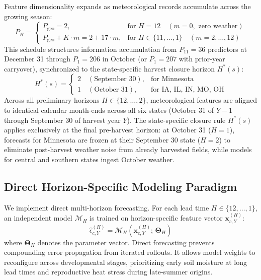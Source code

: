 Feature dimensionality expands as meteorological records accumulate across the growing season:
\begin{equation}
    P_H = 
    \begin{cases}
        P_{\text{geo}} = 2, & \text{for } H = 12 \quad (m = 0, \text{ zero weather}) \\[1ex]
        P_{\text{geo}} + K \cdot m = 2 + 17 \cdot m, & \text{for } H \in \{11, \dots, 1\} \quad (m = 2, \dots, 12)
    \end{cases}
    \label{eq:feature_dimension_formula}
\end{equation}
This schedule structures information accumulation from $P_{11} = 36$ predictors at December 31 through $P_1 = 206$ in October (or $P_1 = 207$ with prior-year carryover), synchronized to the state-specific harvest closure horizon $H^*(s)$:
\begin{equation}
    H^*(s) = 
    \begin{cases}
        2 \quad (\text{September 30}), & \text{for Minnesota} \\
        1 \quad (\text{October 31}), & \text{for IA, IL, IN, MO, OH}
    \end{cases}
    \label{eq:harvest_closure_horizon}
\end{equation}
Across all preliminary horizons $H \in \{12, \dots, 2\}$, meteorological features are aligned to identical calendar month-ends across all six states (October 31 of $Y-1$ through September 30 of harvest year $Y$). The state-specific closure rule $H^*(s)$ applies exclusively at the final pre-harvest horizon: at October 31 ($H=1$), forecasts for Minnesota are frozen at their September 30 state ($H=2$) to eliminate post-harvest weather noise from already harvested fields, while models for central and southern states ingest October weather.

\subsection{Direct Horizon-Specific Modeling Paradigm}
\label{sec:meth_direct_horizon}

We implement direct multi-horizon forecasting. For each lead time $H \in \{12, \dots, 1\}$, an independent model $\mathcal{M}_H$ is trained on horizon-specific feature vector $\mathbf{x}_{c,Y}^{(H)}$:
\begin{equation}
    \hat{\epsilon}_{c,Y}^{(H)} = \mathcal{M}_H\left(\mathbf{x}_{c,Y}^{(H)}; \, \mathbf{\Theta}_H\right)
    \label{eq:direct_model_instance}
\end{equation}
where $\mathbf{\Theta}_H$ denotes the parameter vector. Direct forecasting prevents compounding error propagation from iterated rollouts. It allows model weights to reconfigure across developmental stages, prioritizing early soil moisture at long lead times and reproductive heat stress during late-summer origins.

